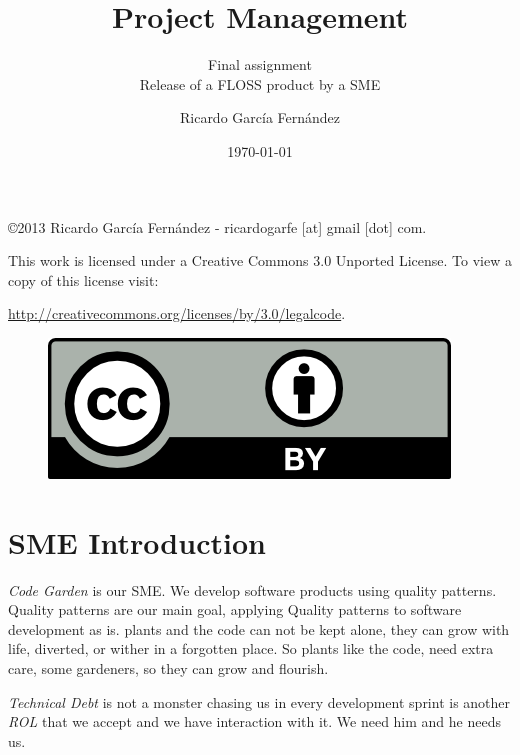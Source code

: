\documentclass[11pt]{scrartcl}
\title{\textbf{Project Management}}
\subtitle{Final assignment\\
            Release of a FLOSS product by a SME}
\author{Ricardo Garc\'ia Fern\'andez}
\date{\today}
\begin{document}
\maketitle

\vfill

\begin{flushright}
    \copyright  2013 Ricardo Garc\'ia Fern\'andez - ricardogarfe [at] gmail [dot] com.

    This work is licensed under a Creative Commons 3.0 Unported License.
    To view a copy of this license visit:
 
    \url{http://creativecommons.org/licenses/by/3.0/legalcode}.
\end{flushright}

\begin{figure}[h]
    \begin{flushright}	
        \includegraphics{by}
        \label{fig:by}
    \end{flushright}
\end{figure}

\newpage

\tableofcontents

\newpage

\section{SME Introduction}
\label{sec:sme-introduction}

\par \emph{Code Garden} is our SME. We develop software products using quality patterns. Quality patterns are our main goal, applying Quality patterns to software development as is. plants and the code can not be kept alone, they can grow with life, diverted, or wither in a forgotten place. So plants like the code, need extra care, some gardeners, so they can grow and flourish. 

\par \emph{Technical Debt} is not a monster chasing us in every development sprint is another \emph{ROL} that we accept and we have interaction with it. We need him and he needs us.
\end{document}
